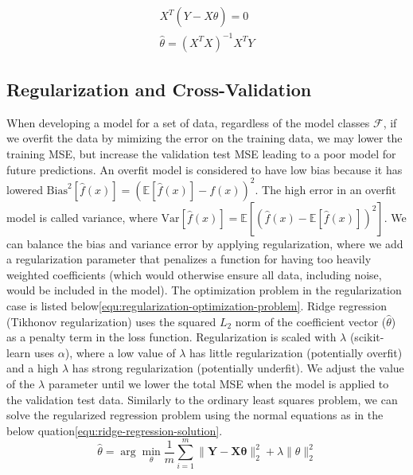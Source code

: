 \documentclass[11pt]{amsart}
\begin{document}
\begin{equation}
    \begin{split}
        X^T(Y - X\hat{\theta}) = 0\\
        \hat{\theta} = (X^TX)^{-1} X^TY
    \end{split}
    \label{equ:linear-solution}
\end{equation}

\subsection{Regularization and Cross-Validation}\label{sec:Regularization}

When developing a model for a set of data, regardless of the model classes $\mathcal{F}$, if we overfit the data by mimizing the error on the training data, 
we may lower the training MSE, but increase the validation test MSE leading to a poor model for future predictions. An overfit model is considered to have 
low bias because it has lowered $\text{Bias}^2[\hat{f}(x)] = \left( \mathbb{E}[\hat{f}(x)] - f(x) \right)^2$. The high error in an overfit model is called 
variance, where $\text{Var}[\hat{f}(x)] = \mathbb{E}\left[ \left( \hat{f}(x) - \mathbb{E}[\hat{f}(x)] \right)^2 \right]$. We can balance the bias and variance 
error by applying regularization, where we add a regularization parameter that penalizes a function for having too heavily weighted coefficients (which would 
otherwise ensure all data, including noise, would be included in the model). The optimization problem in the regularization case is listed below\eqref{equ:regularization-optimization-problem}. 
Ridge regression (Tikhonov regularization) uses the squared $L_2$ norm of the coefficient vector ($\hat{\theta}$) as a penalty term in the loss function. 
Regularization is scaled with $\lambda$ (scikit-learn uses $\alpha$), where a low value of $\lambda$ has little regularization (potentially overfit) and a 
high $\lambda$ has strong regularization (potentially underfit). We adjust the value of the $\lambda$ parameter until we lower the total MSE when the model 
is applied to the validation test data. Similarly to the ordinary least squares problem, we can solve the regularized regression problem using the normal equations 
as in the below quation\eqref{equ:ridge-regression-solution}.\\


\begin{equation}
    \hat{\theta} = \arg\min_{\theta} \frac{1}{m} \sum_{i=1}^{m} \| \boldsymbol{Y} - \boldsymbol{X}\boldsymbol\theta \|^2_2+ \lambda \|\theta\|_2^2
    \label{equ:regularization-optimization-problem}
\end{equation}
\end{document}
